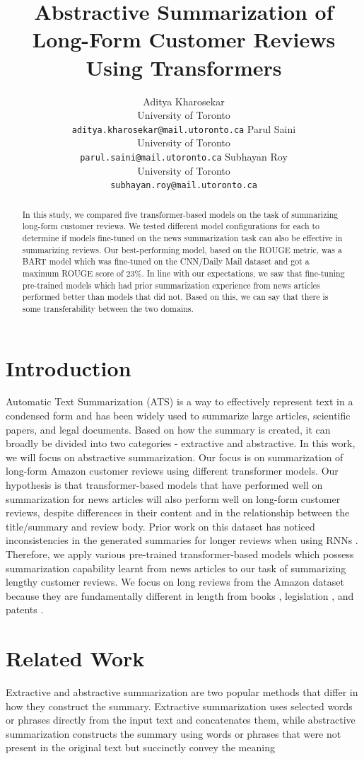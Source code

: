 \documentclass{article}
\title{Abstractive Summarization of Long-Form Customer Reviews Using Transformers}
\author{%
  Aditya Kharosekar\\
  University of Toronto \\
  \texttt{aditya.kharosekar@mail.utoronto.ca}
  \And 
  Parul Saini \\
  University of Toronto \\
  \texttt{parul.saini@mail.utoronto.ca}
  \And
  Subhayan Roy \\
  University of Toronto \\
  \texttt{subhayan.roy@mail.utoronto.ca}
}
\begin{document}
\maketitle

\begin{abstract} 
In this study, we compared five transformer-based models on the task of summarizing long-form customer reviews. We tested different model configurations for each to determine if models fine-tuned on the news summarization task can also be effective in summarizing reviews. Our best-performing model, based on the ROUGE metric, was a BART model which was fine-tuned on the CNN/Daily Mail dataset and got a maximum ROUGE score of 23\%. In line with our expectations, we saw that fine-tuning pre-trained models which had prior summarization experience from news articles performed better than models that did not. Based on this, we can say that there is some transferability between the two domains.
\end{abstract}

\section{Introduction}
Automatic Text Summarization (ATS) is a way to effectively represent text in a condensed form and has been widely used to summarize large articles, scientific papers, and legal documents. Based on how the summary is created, it can broadly be divided into two categories - extractive and abstractive. In this work, we will focus on abstractive summarization.
Our focus is on summarization of long-form Amazon customer reviews \cite{amazonDataset1, amazonDataset2} using different transformer models. Our hypothesis is that transformer-based models that have performed well on summarization for news articles will also perform well on long-form customer reviews, despite differences in their content and in the relationship between the title/summary and review body.
Prior work on this dataset has noticed inconsistencies in the generated summaries for longer reviews when using RNNs \cite{seq2seq}. Therefore, we apply various pre-trained transformer-based models which possess summarization capability learnt from news articles to our task of summarizing lengthy customer reviews. We focus on long reviews from the Amazon dataset because they are fundamentally different in length from books \cite{booksum}, legislation \cite{billsum}, and patents \cite{bigpatent}.

\section{Related Work}
Extractive and abstractive summarization are two popular methods that differ in how they construct the summary. Extractive summarization uses selected words or phrases directly from the input text and concatenates them, while abstractive summarization constructs the summary using words or phrases that were not present in the original text but succinctly convey the meaning \cite{hou2021survey,kassasSurvey}
\end{document}
